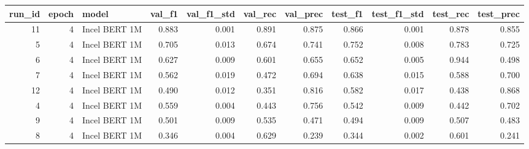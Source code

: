 \begin{tabular}{rrlrrrrrrrr}
\toprule
 run\_id &  epoch &         model &  val\_f1 &  val\_f1\_std &  val\_rec &  val\_prec &  test\_f1 &  test\_f1\_std &  test\_rec &  test\_prec \\
\midrule
     11 &      4 & Incel BERT 1M &   0.883 &       0.001 &    0.891 &     0.875 &    0.866 &        0.001 &     0.878 &      0.855 \\
      5 &      4 & Incel BERT 1M &   0.705 &       0.013 &    0.674 &     0.741 &    0.752 &        0.008 &     0.783 &      0.725 \\
      6 &      4 & Incel BERT 1M &   0.627 &       0.009 &    0.601 &     0.655 &    0.652 &        0.005 &     0.944 &      0.498 \\
      7 &      4 & Incel BERT 1M &   0.562 &       0.019 &    0.472 &     0.694 &    0.638 &        0.015 &     0.588 &      0.700 \\
     12 &      4 & Incel BERT 1M &   0.490 &       0.012 &    0.351 &     0.816 &    0.582 &        0.017 &     0.438 &      0.868 \\
      4 &      4 & Incel BERT 1M &   0.559 &       0.004 &    0.443 &     0.756 &    0.542 &        0.009 &     0.442 &      0.702 \\
      9 &      4 & Incel BERT 1M &   0.501 &       0.009 &    0.535 &     0.471 &    0.494 &        0.009 &     0.507 &      0.483 \\
      8 &      4 & Incel BERT 1M &   0.346 &       0.004 &    0.629 &     0.239 &    0.344 &        0.002 &     0.601 &      0.241 \\
\bottomrule
\end{tabular}
